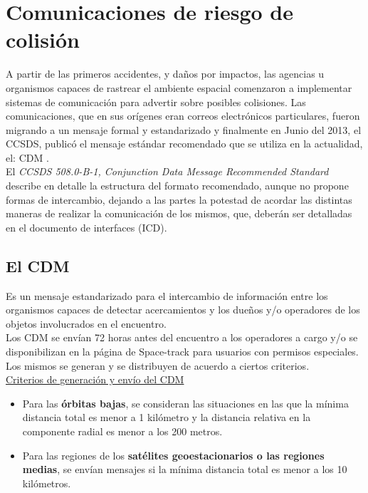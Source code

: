 {\section{Comunicaciones de riesgo de colisi\'on}{\label{sec:anuncio}}


A partir de las primeros accidentes, y da\~nos por impactos, las agencias u organismos capaces de rastrear el ambiente espacial comenzaron a implementar sistemas de comunicaci\'on para advertir sobre posibles colisiones. Las comunicaciones, que en sus or\'igenes eran correos electr\'onicos particulares, fueron migrando a un mensaje formal y estandarizado y finalmente en Junio del 2013, el \ac{CCSDS}, public\'o el mensaje est\'andar recomendado que se utiliza en la actualidad, el: \ac{CDM} \citep{CDM}.\\
El {\it{CCSDS 508.0-B-1, Conjunction Data Message Recommended Standard}} describe en detalle la estructura del formato recomendado, aunque no propone formas de intercambio, dejando a las partes la potestad de acordar las distintas maneras de realizar la comunicaci\'on de los mismos, que, deber\'an ser detalladas en el documento de interfaces (ICD).\\

\subsection{El CDM}\label{subsec:cdm}

Es un mensaje estandarizado para el intercambio de informaci\'on entre los organismos capaces de detectar acercamientos y los due\~nos y/o operadores de los objetos involucrados en el encuentro.\\
Los CDM se env\'ian 72 horas antes del encuentro a los operadores a cargo y/o se disponibilizan en la p\'agina de Space-track para usuarios con permisos especiales.\\
Los mismos se generan y se distribuyen de acuerdo a ciertos criterios.\\


\underline{Criterios de generaci\'on y env\'io del CDM}
\begin{itemize}
\item Para las {\bf{\'orbitas bajas}}, se consideran las situaciones en las que la m\'inima distancia total es menor a 1 kil\'ometro y la distancia relativa en la componente radial es menor a los 200 metros.\\

\item Para las regiones de los {\bf{sat\'elites geoestacionarios o las regiones medias}}, se env\'ian mensajes si la m\'inima distancia total es menor a los 10 kil\'ometros.\\
\end{itemize}


}

